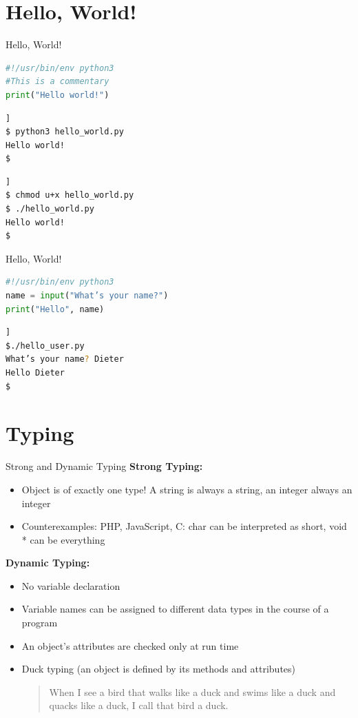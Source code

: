 \documentclass[xcolor=dvipsnames,aspectratio=169]{beamer}
\begin{document}
\section{Hello, World!}
\begin{frame}[fragile]{Hello, World!}
\begin{lstlisting}[language=Python]
#!/usr/bin/env python3
#This is a commentary
print("Hello world!")
\end{lstlisting}
\begin{lstlisting}[language=Bash ,backgroundcolor=\color{green!20}]]
$ python3 hello_world.py
Hello world!
$
\end{lstlisting}
\begin{lstlisting}[language=Bash ,backgroundcolor=\color{green!20}]]
$ chmod u+x hello_world.py
$ ./hello_world.py
Hello world!
$
\end{lstlisting}
\end{frame}

\begin{frame}[fragile]{Hello, World!}
\begin{lstlisting}[language=Python]
#!/usr/bin/env python3
name = input("What’s your name?")
print("Hello", name)
\end{lstlisting}
\begin{lstlisting}[language=Bash ,backgroundcolor=\color{green!20}]]
$./hello_user.py
What’s your name? Dieter
Hello Dieter
$
\end{lstlisting}
\end{frame}

\section{Typing}
\begin{frame}{Strong and Dynamic Typing}
\textbf{Strong Typing:}
\begin{itemize}
	\item Object is of exactly one type! A string is always a string, an integer always an integer
	\item Counterexamples: PHP, JavaScript, C: char can be interpreted as short, void * can be everything
\end{itemize}
\textbf{Dynamic Typing:}
	\begin{itemize}
		\item No variable declaration
		\item Variable names can be assigned to different data types in the course of a program
		\item An object’s attributes are checked only at run time 
		\item Duck typing (an object is defined by its methods and attributes)
		\begin{quote}
		When I see a bird that walks like a duck and swims like a duck and quacks like a duck, I call that bird a duck.
		\end{quote}
	\end{itemize}
\end{frame}
\end{document}
